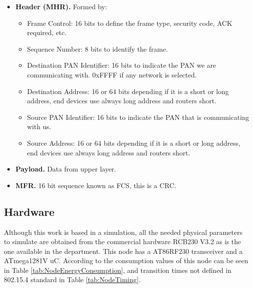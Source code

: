 \begin{itemize}
 \item \textbf{Header (\ac{MHR}).} Formed by:
  \begin{itemize}
   \item Frame Control: 16 bits to define the frame type, security code, \ac{ACK} required, etc.
   \item Sequence Number: 8 bits to identify the frame.
   \item Destination \ac{PAN} Identifier: 16 bits to indicate the \ac{PAN} we are communicating with. 0xFFFF if any network is selected.
   \item Destination Address: 16 or 64 bits depending if it is a short or long address, end devices use always long address and routers short.
   \item Source PAN Identifier: 16 bits to indicate the \ac{PAN} that is communicating with us.
   \item Source Address: 16 or 64 bits depending if it is a short or long address, end devices use always long address and routers short.
  \end{itemize}
 \item \textbf{Payload.} Data from upper layer.
 \item \textbf{\ac{MFR}.} 16 bit sequence known as \ac{FCS}, this is a \ac{CRC}.
\end{itemize}

\subsection{Hardware}

Although this work is based in a simulation, all the needed physical parameters to simulate are obtained from the commercial hardware 
RCB230 V3.2 as is the one available in the department. This node has a AT86RF230 transceiver and a ATmega1281V \ac{uC}. According 
to \cite{LPLandOLP} the consumption values of this node can be seen in Table \ref{tab:NodeEnergyConsumption}, and transition times not defined
in 802.15.4 standard in Table \ref{tab:NodeTiming}.


